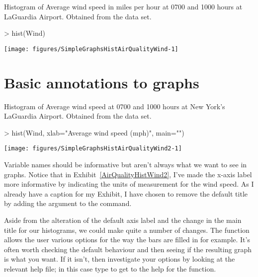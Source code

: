 \begin{exhibit} 
\begin{center} 
\caption{Histogram of Average wind speed in miles per hour at 0700 and 1000 hours at LaGuardia Airport. Obtained from the  data set.} 
\label{AirQualityHistWind} 
\begin{Schunk}
\begin{Sinput}
> hist(Wind) 
\end{Sinput}
\end{Schunk}
\texttt{[image: figures/SimpleGraphsHistAirQualityWind-1]} 

\end{center} 
\end{exhibit} 
 
\section{Basic annotations to graphs} 
 
\begin{exhibit} 
\begin{center} 
\caption{Histogram of Average wind speed at 0700 and 1000 hours at New York's LaGuardia Airport. Obtained from the  data set.} 
\label{AirQualityHistWind2} 
\begin{Schunk}
\begin{Sinput}
> hist(Wind, xlab="Average wind speed (mph)", main="") 
\end{Sinput}
\end{Schunk}
\texttt{[image: figures/SimpleGraphsHistAirQualityWind2-1]} 

\end{center} 
\end{exhibit} 
 
Variable names should be informative but aren't always what we want to see in graphs. Notice that in Exhibit~\ref{AirQualityHistWind2}, I've made the x-axis label more informative by indicating the units of measurement for the wind speed. As I already have a caption for my Exhibit, I have chosen to remove the default title by adding the argument  to the  command. 
 
Aside from the alteration of the default axis label and the change in the main title for our histograms, we could make quite a number of changes. The  function allows the user various options for the way the bars are filled in for example. It's often worth checking the default behaviour and then seeing if the resulting graph is what you want. If it isn't, then investigate your options by looking at the relevant help file; in this case type  to get to the help for the  function. 
 
